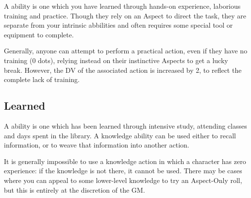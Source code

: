 A  ability is one which you have learned through hands-on experience, laborious training and practice. Though they rely on an Aspect to direct the task, they are separate from your intrinsic abbilities and often requires some special tool or equipment to complete. 

Generally, anyone can attempt to perform a practical action, even if they have no training (0 dots), relying instead on their instinctive Aspects to get a lucky break. However, the DV of the associated action is increased by 2, to reflect the complete lack of training. 
 
\abilityTable
{
}

\subsection{Learned}

A  ability is one which has been learned through intensive study, attending classes and days spent in the library. A knowledge ability can be used either to recall information, or to weave that information into another action. 

It is generally impossible to use a knowledge action in which a character has zero experience: if the knowledge is not there, it cannot be used. There may be cases where you can appeal to some lower-level knowledge to try an Aspect-Only roll, but this is entirely at the discretion of the GM.
	
